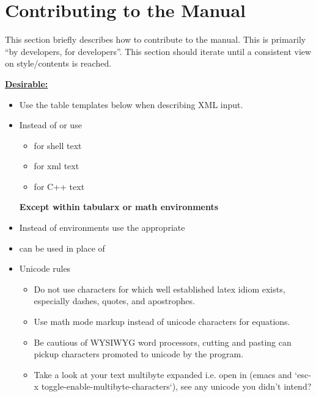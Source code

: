 
\chapter{Contributing to the Manual}
\label{chap:contrib}

This section briefly describes how to contribute to the manual.  This is primarily ``by developers, for developers''.   This section should iterate until a consistent view on style/contents is reached.

\textbf{\underline{Desirable:}}
\begin{itemize}
\item{Use the table templates below when describing XML input.}
\item{Instead of \ilatex{\\texttt} or \ilatex{\\verb} use
    \begin{itemize}
      \item{\ilatex{\\ishell} for shell text}
      \item{\ilatex{\\ixml} for xml text}
      \item{\ilatex{\\icode} for C++ text}
      \end{itemize}
     \bf{Except} within tabularx or math environments}
    \item{Instead of  environments use the appropriate }
\item{ can be used in place of }
\item{Unicode rules}
\begin{itemize}
\item Do not use characters for which well established latex idiom exists, especially dashes, quotes, and apostrophes.
\item Use math mode markup instead of unicode characters for equations.
\item Be cautious of WYSIWYG word processors, cutting and pasting can pickup characters promoted to unicode by the program.
\item Take a look at your text multibyte expanded i.e. open in (emacs and `esc-x toggle-enable-multibyte-characters`), see any unicode you didn't intend?

\end{itemize}
\end{itemize}
